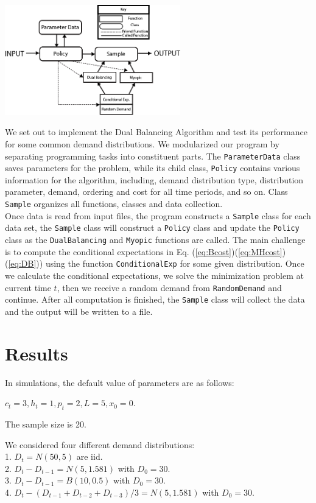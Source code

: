 \documentclass[twoside]{article}
\begin{document}
\begin{multicols}{2}
\begin{center}
  \label{figure:software_diagram}
  \includegraphics[width=3.0in]{software_diagram.png}
\end{center}
We set out to implement the Dual Balancing Algorithm and test its performance for some common demand distributions. We modularized our program by separating programming tasks into constituent parts. The \texttt{ParameterData} class saves parameters for the problem, while its child class, \texttt{Policy} contains various information for the algorithm, including, demand distribution type, distribution parameter, demand, ordering and cost for all time periods, and so on. Class \texttt{Sample} organizes all functions, classes and data collection.\\
Once data is read from input files, the program constructs a \texttt{Sample} class for each data set, the \texttt{Sample} class will construct a \texttt{Policy} class and update the \texttt{Policy} class as the \texttt{DualBalancing} and \texttt{Myopic} functions are called. The main challenge is to compute the conditional expectations in Eq. (\ref{eq:Bcost})(\ref{eq:MHcost})(\ref{eq:DB})) using the function \texttt{ConditionalExp} for some given distribution. Once we calculate the conditional expectations, we solve the minimization problem at current time $t$, then we receive a random demand from \texttt{RandomDemand} and continue. After all computation is finished, the \texttt{Sample} class will collect the data and the output will be written to a file.

\section{Results}

In simulations, the default value of parameters are as follows:
\begin{compactitem}
      \item $c_t = 3, h_t = 1, p_t = 2, L=5, x_0=0$.
      \item The sample size is 20.
      \item We considered four different demand distributions:\\
            1. $D_t = N(50,5)$ are iid.\\
            2. $D_t-D_{t-1} = N(5,1.581)$ with $D_0=30$.\\
            3. $D_t-D_{t-1} = B(10,0.5)$ with $D_0=30$.\\
            4. $D_t- (D_{t-1} + D_{t-2} + D_{t-3})/3 = N(5,1.581)$ with $D_0=30$.
\end{compactitem}


\end{multicols}
\end{document}
